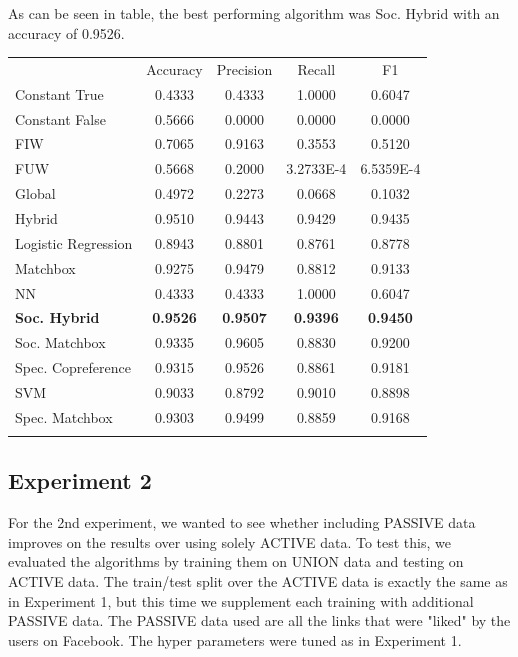 As can be seen in table, the best performing algorithm was Soc. Hybrid with an accuracy of 0.9526.

\begin{table}
\begin{tabular}{ l  c  c  c  c }
\hline\noalign{\smallskip}
 & Accuracy & Precision & Recall & F1 \\
  \noalign{\smallskip}\hline\noalign{\smallskip}
Constant True & 0.4333 &  0.4333 & 1.0000  & 0.6047 \\
Constant False & 0.5666  & 0.0000 & 0.0000 & 0.0000 \\
FIW & 0.7065 &  0.9163 & 0.3553 &  0.5120  \\
FUW & 0.5668 & 0.2000  & 3.2733E-4  & 6.5359E-4 \\
Global & 0.4972 & 0.2273  & 0.0668 & 0.1032 \\
Hybrid &  0.9510 & 0.9443  & 0.9429 & 0.9435  \\
Logistic Regression &  0.8943  & 0.8801 & 0.8761  & 0.8778  \\
Matchbox & 0.9275 & 0.9479 & 0.8812 & 0.9133 \\
NN & 0.4333 & 0.4333 & 1.0000 & 0.6047 \\
{\bf Soc. Hybrid} & {\bf 0.9526} & {\bf 0.9507}  & {\bf 0.9396}  & {\bf 0.9450}  \\
Soc. Matchbox & 0.9335 & 0.9605  & 0.8830  & 0.9200  \\
Spec. Copreference & 0.9315  & 0.9526  & 0.8861  & 0.9181 \\
SVM & 0.9033  & 0.8792 & 0.9010  & 0.8898  \\
Spec. Matchbox & 0.9303  & 0.9499  & 0.8859 & 0.9168  \\
\noalign{\smallskip}\hline
\end{tabular}
\end{table}




\subsection{Experiment 2}
\label{sec:2}

For the 2nd experiment, we wanted to see whether including PASSIVE data improves on the results over using solely ACTIVE data.
To test this, we evaluated the algorithms by training them on UNION data and testing on ACTIVE data. The train/test split over the ACTIVE data is exactly
the same as in Experiment 1, but this time we supplement each training with additional PASSIVE data. The PASSIVE data used are all the 
links that were "liked" by the users on Facebook. The hyper parameters were tuned as in Experiment 1.



